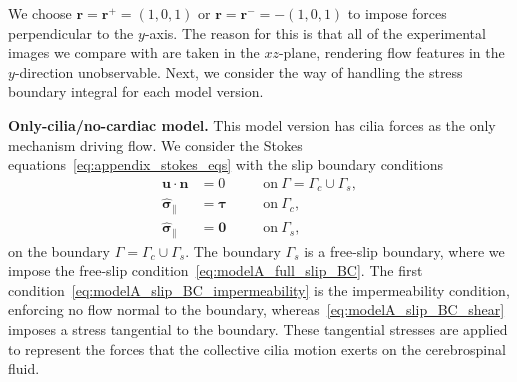 \documentclass[fleqn]{wlscirep}
\newcommand{\Gs}{\Gamma_{s}}
\newcommand{\Gc}{\Gamma_{c}}
\newcommand{\nn}{\mathbf{n}}
\newcommand{\rr}{\mathbf{r}}
\newcommand{\uu}{\mathbf{u}}
\newcommand{\bsig}{\bm{\sigma}}
\newcommand{\bsigpar}{\hat{\bsig}_{\parallel}}
\newcommand{\btau}{\bm{\tau}}
\begin{document}
We choose $\mathbf{r} = \rr^+ = (1, 0, 1)$ or $\mathbf{r} = \rr^- = -(1, 0, 1)$
to impose forces perpendicular to the $y$-axis.
The reason for this is that all of the experimental images we compare
with are taken in the $xz$-plane,
rendering flow features in the $y$-direction unobservable.
Next, we consider the way of handling the stress boundary integral for each model version. 

\textbf{Only-cilia/no-cardiac model.} This model version has cilia forces
as the only mechanism driving flow. We consider the
Stokes equations~\eqref{eq:appendix_stokes_eqs} with the slip boundary conditions
\begin{subequations}
    \begin{alignat}{2}
        \uu\cdot\nn &= 0 \quad &&\mathrm{on} \ \Gamma=\Gc\cup\Gs, \label{eq:modelA_slip_BC_impermeability} \\
        \bsigpar &= \btau \quad &&\mathrm{on} \ \Gc,
        \label{eq:modelA_slip_BC_shear} \\
        \bsigpar &= \mathbf{0} \quad &&\mathrm{on} \ \Gs,\label{eq:modelA_full_slip_BC}
    \end{alignat}\label{eq:modelA_slip_BC}%
\end{subequations}%
on the boundary $\Gamma=\Gamma_c\cup\Gamma_s$. The boundary $\Gamma_s$ is a free-slip boundary,
where we impose the free-slip condition~\eqref{eq:modelA_full_slip_BC}.
The first condition~\eqref{eq:modelA_slip_BC_impermeability} is the
impermeability condition, enforcing no flow normal to the boundary,
whereas~\eqref{eq:modelA_slip_BC_shear} imposes a stress tangential to
the boundary. These tangential stresses are applied to represent
the forces that the collective cilia motion exerts on the cerebrospinal fluid. 
\end{document}
